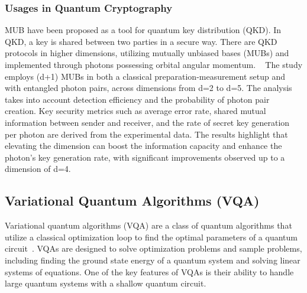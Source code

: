 \subsubsection{Usages in Quantum Cryptography}
MUB have been proposed as a tool for quantum key distribution (QKD).
In QKD, a key is shared between two parties in a secure way. There are QKD protocols in higher dimensions, 
utilizing mutually unbiased bases (MUBs) and implemented
through photons possessing orbital angular momentum. ~\cite{mafu2013higher}
The study employs (d+1) MUBs in both a classical preparation-measurement setup and with entangled photon pairs,
across dimensions from d=2 to d=5. The analysis takes into account detection efficiency and the probability of photon pair creation.
Key security metrics such as average error rate, shared mutual information between sender and receiver,
and the rate of secret key generation per photon are derived from the experimental data.
The results highlight that elevating the dimension can boost the information capacity and enhance the
photon's key generation rate, with significant improvements observed up to a dimension of d=4.

\subsection{Variational Quantum Algorithms (VQA)}\label{subsec:variational-quantum-algorithms}
Variational quantum algorithms (VQA) are a class of quantum algorithms that utilize a classical optimization loop to
find the optimal parameters of a quantum circuit~\cite{cerezo2021variational}.
VQAs are designed to solve optimization problems and sample problems,
including finding the ground state energy of a quantum system and solving linear systems of equations. One of the key features
of VQAs is their ability to handle large quantum systems with a shallow quantum circuit.

